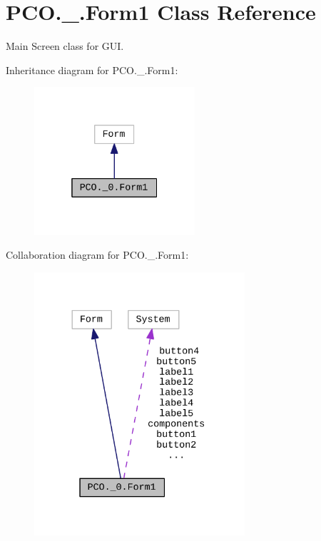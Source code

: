 \hypertarget{classPCO_1_1__0_1_1Form1}{}\section{P\+C\+O.\+\_.\+Form1 Class Reference}
\label{classPCO_1_1__0_1_1Form1}


Main Screen class for G\+UI.  




Inheritance diagram for P\+C\+O.\+\_.\+Form1\+:\nopagebreak
\begin{figure}[H]
\begin{center}
\leavevmode
\includegraphics[width=169pt]{classPCO_1_1__0_1_1Form1__inherit__graph}
\end{center}
\end{figure}


Collaboration diagram for P\+C\+O.\+\_.\+Form1\+:\nopagebreak
\begin{figure}[H]
\begin{center}
\leavevmode
\includegraphics[width=221pt]{classPCO_1_1__0_1_1Form1__coll__graph}
\end{center}
\end{figure}
